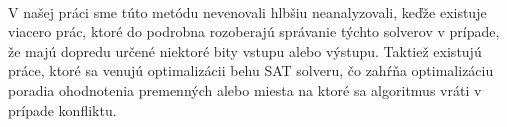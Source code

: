\paragraph{}
V našej práci sme túto metódu nevenovali hlbšiu neanalyzovali, keďže existuje viacero prác, ktoré do podrobna rozoberajú správanie týchto solverov v prípade, že majú dopredu určené niektoré bity vstupu alebo výstupu. Taktiež existujú práce, ktoré sa venujú optimalizácii behu SAT solveru, čo zahŕňa optimalizáciu poradia ohodnotenia premenných alebo miesta na ktoré sa algoritmus vráti v prípade konfliktu. 